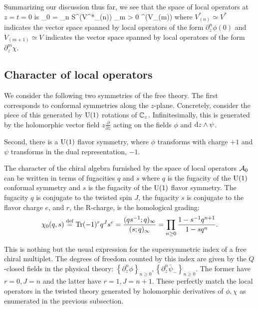 \documentclass[11pt]{amsart}
\begin{document}
Summarizing our discussion thus far, we see that the space of local operators at $z=t=0$ is
\beqn\label{eqn:freeops}
\cA_0 = \bigotimes_{n } {\rm S}^\bu \big(V^*_{(n)}\big) \otimes \bigotimes_{m > 0} \wedge^\bu \big(V_{(m)}\big)
\eeqn
where $V_{(n)}^* \simeq V^*$ indicates the vector space spanned by local operators of the form $\partial^n_{z} \phi(0)$ and $V_{(m+1)} \simeq V$ indicates the vector space spanned by local operators of the form $\partial^{m}_z \chi$. 


\subsection{Character of local operators}

We consider the following two symmetries of the free theory.
The first corresponds to conformal symmetries along the $z$-plane. 
Concretely, consider the piece of this generated by ${\rm U}(1)$ rotations of $\mathbb C_z$.
Infinitesimally, this is generated by the holomorphic vector field $z \frac{\partial}{\partial z}$ acting on the fields $\phi$ and ${\rm d} z \wedge \psi$. 

Second, there is a ${\rm U}(1)$ flavor symmetry, where $\phi$ transforms with charge $+1$ and $\psi$ transforms in the dual representation, $-1$.

The character of the chiral algebra furnished by the space of local operators $\mathcal A_0$ can be written in terms of fugacities $q$ and $s$ where $q$ is the fugacity of the ${\rm U}(1)$ conformal symmetry and $s$ is the fugacity of the ${\rm U}(1)$ flavor symmetry. The fugacity $q$ is conjugate to the twisted spin $J$, the fugacity $s$ is conjugate to the flavor charge $e$, and $r$, the R-charge, is the homological grading:
\[
\chi_0(q , s) \overset{\rm def}{=} \operatorname{Tr} (-1)^r q^J s^e =  \frac{(q s^{-1} ; q)_\infty}{(s ; q)_\infty}  = \prod_{n \geq 0} \frac{1 - s^{-1} q^{n+1}}{1 - s q^n}.
\]

This is nothing but the usual expression for the supersymmetric index of a free chiral multiplet. The degrees of freedom counted by this index are given by the $Q$-closed fields in the physical theory: $\left\lbrace \partial_z^n \phi \right\rbrace_{n \geq 0}, \left\lbrace \partial_z^n \bar{\psi}_- \right\rbrace_{n \geq 0}$. The former have $r=0, J = n$ and the latter have $r=1, J= n+1$. These perfectly match the local operators in the twisted theory generated by holomorphic derivatives of $\phi, \chi$ as enumerated in the previous subsection.
\end{document}
